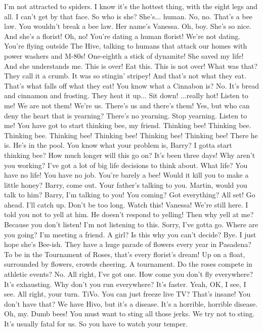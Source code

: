 \documentclass[a4paper,12pt]{article}
\begin{document}
I'm not attracted to spiders.
I know it's the hottest thing, with the eight legs and all. I can't get by that face.
So who is she?
She's... human.
No, no. That's a bee law. You wouldn't break a bee law.
Her name's Vanessa.
Oh, boy.
She's so nice. And she's a florist!
Oh, no! You're dating a human florist!
We're not dating.
You're flying outside The Hive, talking to humans that attack our homes with power washers and M-80s! One-eighth a stick of dynamite!
She saved my life! And she understands me.
This is over!
Eat this.
This is not over! What was that?
They call it a crumb.
It was so stingin' stripey!
And that's not what they eat.
That's what falls off what they eat!
You know what a Cinnabon is?
No.
It's bread and cinnamon and frosting. They heat it up...
Sit down!
...really hot!
Listen to me!
We are not them! We're us.
There's us and there's them!
Yes, but who can deny the heart that is yearning?
There's no yearning. Stop yearning. Listen to me!
You have got to start thinking bee, my friend. Thinking bee!
Thinking bee.
Thinking bee.
Thinking bee! Thinking bee! Thinking bee! Thinking bee!
There he is. He's in the pool.
You know what your problem is, Barry?
I gotta start thinking bee?
How much longer will this go on?
It's been three days! Why aren't you working?
I've got a lot of big life decisions to think about.
What life? You have no life!
You have no job. You're barely a bee!
Would it kill you to make a little honey?
Barry, come out. Your father's talking to you.
Martin, would you talk to him?
Barry, I'm talking to you!
You coming?
Got everything?
All set!
Go ahead. I'll catch up.
Don't be too long.
Watch this!
Vanessa!
We're still here.
I told you not to yell at him.
He doesn't respond to yelling!
Then why yell at me?
Because you don't listen!
I'm not listening to this.
Sorry, I've gotta go.
Where are you going?
I'm meeting a friend.
A girl? Is this why you can't decide?
Bye.
I just hope she's Bee-ish.
They have a huge parade of flowers every year in Pasadena?
To be in the Tournament of Roses, that's every florist's dream!
Up on a float, surrounded by flowers, crowds cheering.
A tournament. Do the roses compete in athletic events?
No. All right, I've got one.
How come you don't fly everywhere?
It's exhausting. Why don't you run everywhere? It's faster.
Yeah, OK, I see, I see.
All right, your turn.
TiVo. You can just freeze live TV? That's insane!
You don't have that?
We have Hivo, but it's a disease. It's a horrible, horrible disease.
Oh, my.
Dumb bees!
You must want to sting all those jerks.
We try not to sting. It's usually fatal for us.
So you have to watch your temper.
\end{document}
